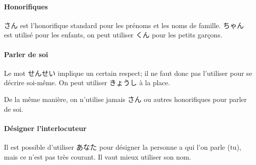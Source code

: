 \documentclass[a4paper,10pt,french,openany]{memoir}
\begin{document}
\paragraph{Honorifiques}
さん est l'honorifique standard pour les prénoms et les noms de famille. ちゃん est utilisé pour les enfants, on peut utiliser くん pour les petits garçons.

\paragraph{Parler de soi}
Le mot せんせい implique un certain respect; il ne faut donc pas l'utiliser pour se décrire soi-même. On peut utiliser きょうし à la place.

De la même manière, on n'utilise jamais さん ou autres honorifiques pour parler de soi.

\paragraph{Désigner l'interlocuteur}
Il est possible d'utiliser あなた pour désigner la personne a qui l'on parle (tu), mais ce n'est pas très courant. Il vaut mieux utiliser son nom.
\end{document}
